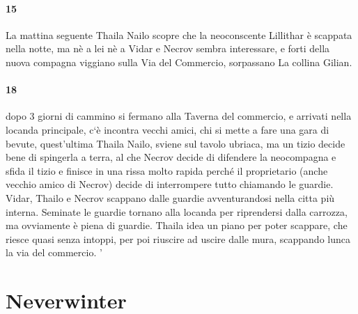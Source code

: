 \documentclass{article}
\begin{document}
      \paragraph{15} La mattina seguente Thaila Nailo scopre che la neoconscente Lillithar è scappata nella notte, ma nè a lei nè a Vidar e Necrov sembra interessare, e forti della nuova compagna viggiano sulla  Via del Commercio, sorpassano La collina Gilian.
      \paragraph{18} dopo 3 giorni di cammino si fermano alla Taverna del commercio, e arrivati nella locanda principale, c`è incontra vecchi amici, chi si mette a fare una gara di bevute, quest'ultima Thaila Nailo, sviene sul tavolo ubriaca, ma un tizio decide bene di spingerla a terra, al che Necrov decide di difendere la neocompagna e sfida il tizio e finisce in una rissa molto rapida perché il proprietario (anche vecchio amico di Necrov) decide di interrompere tutto chiamando le guardie. Vidar, Thailo e Necrov scappano dalle guardie avventurandosi nella citta più interna. Seminate le guardie tornano alla locanda per riprendersi dalla carrozza, ma ovviamente è piena di guardie. Thaila idea un piano per poter scappare, che riesce quasi senza intoppi, per poi riuscire ad uscire dalle mura, scappando lunca la via del commercio.  '

\section{Neverwinter}
\end{document}
